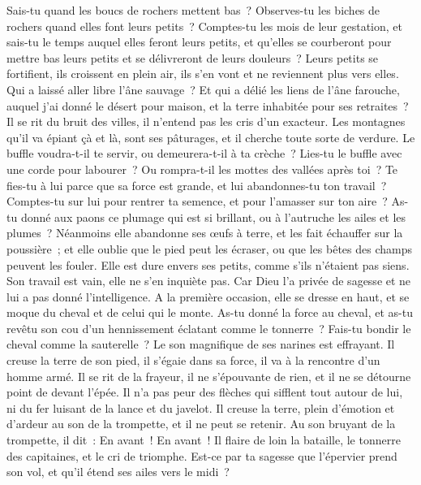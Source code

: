 \begin{multicols}{2}
Sais-tu quand les boucs de rochers mettent bas~? Observes-tu les biches de rochers quand elles font leurs petits~?
Comptes-tu les mois de leur gestation, et sais-tu le temps auquel elles feront leurs petits,
et qu'elles se courberont pour mettre bas leurs petits et se délivreront de leurs douleurs~?
Leurs petits se fortifient, ils croissent en plein air, ils s'en vont et ne reviennent plus vers elles.
Qui a laissé aller libre l'âne sauvage~? Et qui a délié les liens de l'âne farouche,
auquel j'ai donné le désert pour maison, et la terre inhabitée pour ses retraites~?
Il se rit du bruit des villes, il n'entend pas les cris d'un exacteur.
Les montagnes qu'il va épiant çà et là, sont ses pâturages, et il cherche toute sorte de verdure. 
Le buffle voudra-t-il te servir, ou demeurera-t-il à ta crèche~? 
Lies-tu le buffle avec une corde pour labourer~? Ou rompra-t-il les mottes des vallées après toi~? 
Te fies-tu à lui parce que sa force est grande, et lui abandonnes-tu ton travail~? 
Comptes-tu sur lui pour rentrer ta semence, et pour l'amasser sur ton aire~? 
As-tu donné aux paons ce plumage qui est si brillant, ou à l'autruche les ailes et les plumes~? 
Néanmoins elle abandonne ses œufs à terre, et les fait échauffer sur la poussière~;
et elle oublie que le pied peut les écraser, ou que les bêtes des champs peuvent les fouler. 
Elle est dure envers ses petits, comme s'ils n'étaient pas siens. Son travail est vain, elle ne s'en inquiète pas.
Car Dieu l'a privée de sagesse et ne lui a pas donné l'intelligence.
A la première occasion, elle se dresse en haut, et se moque du cheval et de celui qui le monte. 
As-tu donné la force au cheval, et as-tu revêtu son cou d'un hennissement éclatant comme le tonnerre~? 
Fais-tu bondir le cheval comme la sauterelle~? Le son magnifique de ses narines est effrayant.
Il creuse la terre de son pied, il s'égaie dans sa force, il va à la rencontre d'un homme armé.
Il se rit de la frayeur, il ne s'épouvante de rien, et il ne se détourne point de devant l'épée.
Il n'a pas peur des flèches qui sifflent tout autour de lui, ni du fer luisant de la lance et du javelot. 
Il creuse la terre, plein d'émotion et d'ardeur au son de la trompette, et il ne peut se retenir. 
Au son bruyant de la trompette, il dit~: En avant~! En avant~! Il flaire de loin la bataille, le tonnerre des capitaines, et le cri de triomphe.
Est-ce par ta sagesse que l'épervier prend son vol, et qu'il étend ses ailes vers le midi~?

\end{multicols}

